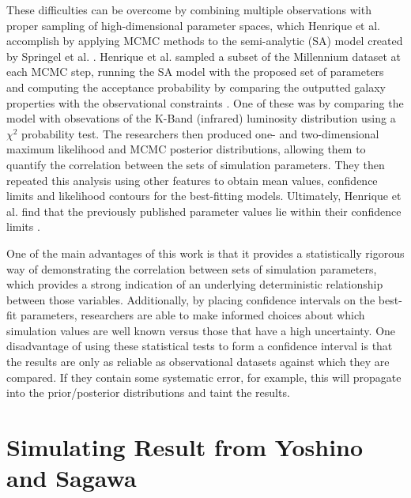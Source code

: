 \documentclass[amsmath,amssymb,reprint,
tightenlines,aps,prl,11pt]{revtex4-1}
\begin{document}
These difficulties can be overcome by combining multiple observations with proper sampling of high-dimensional parameter spaces, which Henrique et al. accomplish by applying MCMC methods to the semi-analytic (SA) model created by Springel et al. \cite{springelSimulatingJointEvolution2005}. Henrique et al. sampled a subset of the Millennium dataset at each MCMC step, running the SA model with the proposed set of parameters and computing the acceptance probability by comparing the outputted galaxy properties with the observational constraints \cite{henriquesMonteCarloMarkov2009}. One of these was by comparing the model with obsevations of the K-Band (infrared) luminosity distribution using a $\chi^2$ probability test. The researchers then produced one- and two-dimensional maximum likelihood  and MCMC posterior distributions, allowing them to quantify the correlation between the sets of simulation parameters. They then repeated this analysis using other features to obtain mean values, confidence limits and likelihood contours for the best-fitting models. Ultimately, Henrique et al. find that the previously published parameter values lie within their confidence limits \cite{henriquesMonteCarloMarkov2009}. 

One of the main advantages of this work is that it provides a statistically rigorous way of demonstrating the correlation between sets of simulation parameters, which provides a strong indication of an underlying deterministic relationship between those variables. Additionally, by placing confidence intervals on the best-fit parameters, researchers are able to make informed choices about which simulation values are well known versus those that have a high uncertainty. One disadvantage of using these statistical tests to form a confidence interval is that the results are only as reliable as observational datasets against which they are compared. If they contain some systematic error, for example, this will propagate into the prior/posterior distributions and taint the results. 

\section{Simulating Result from Yoshino and Sagawa}
\end{document}
